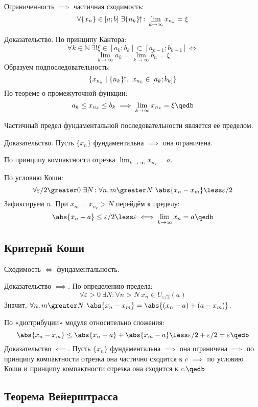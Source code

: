 \begin{theorem}
Ограниченность $\implies$ частичная сходимость:
$$\forall\{x_n\}\in[a;b]\ \exists\{n_k\}\kern-4pt\uparrow\colon\lim_{k\to\infty}x_{n_k}=
\xi$$
\end{theorem}
{\bold Доказательство.} По принципу Кантора:
$$\forall k\in\mathbb{N}\ \exists!\xi\in[a_k;b_k]\subset[a_{k-1};b_{k-1}]\iff$$
$$\lim_{k\to\infty}a_k=\lim_{k\to\infty}b_n=\xi$$
Образуем подпоследовательность:
$$\{x_{n_k}\mid \{n_k\}\kern-4pt\uparrow,\ x_{n_k}\in[a_k;b_k]\}$$
По теореме о промежуточной функции:
$$a_k\leq x_{n_k}\leq b_k\implies \lim_{k\to\infty}x_{n_k}=\xi\qedb$$
\begin{theorem}
Частичный предел фундаментальной последовательности является её пределом.
\end{theorem}
{\bold Доказательство.} Пусть $\{x_n\}$ фундаментальна $\implies$ она ограничена.

По принципу компактности отрезка $\lim_{k\to\infty}x_{n_k}=a$.

По условию Коши:
$$\forall\varepsilon/2\greater 0\ \exists N\colon\forall n,m\greater N\ \abs{x_n-x_m}
\less\varepsilon/2$$
Зафиксируем $n$. При $x_m=x_{n_k}\greater N$ перейдём к пределу:
$$\abs{x_n-a}\leq\varepsilon/2\less\varepsilon\iff\lim_{k\to\infty}x_n=a\qedb$$

\subsection{Критерий Коши}

\begin{theorem}
Сходимость $\iff$ фундаментальность.
\end{theorem}
{\bold Доказательство $\implies$.} По определению предела:
$$\forall\varepsilon\greater 0\ \exists N\colon\forall n\greater N\ x_n\in U_
{\varepsilon/2}(a)$$ 
Значит, $\forall n,m\greater N\ \abs{x_n-x_m}=\abs{(x_n-a)+(a-x_m)}$.

По «дистрибуции» модуля относительно сложения:
$$\abs{x_n-x_m}\leq\abs{x_n-a}+\abs{x_m-a}\less \varepsilon/2+\varepsilon/2=\varepsilon
\qedb$$
{\bold Доказательство $\impliedby$.} Пусть $\{x_n\}$ фундаментальна $\implies$ она 
ограничена $\implies$ по принципу компактности отрезка она частично сходится к $c$
$\implies$ по условию Коши и принципу компактности отрезка она сходится к $c$.$\qedb$

\subsection{Теорема Вейерштрасса}

